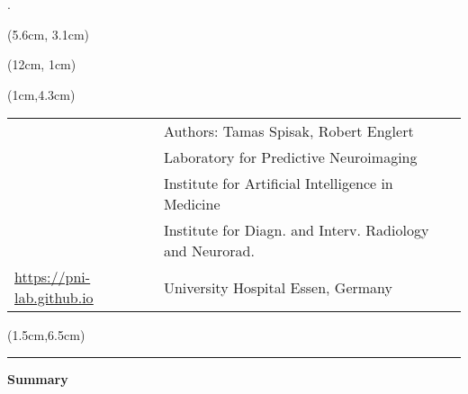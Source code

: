 \begin{titlepage}.
    

    \vspace{2.5cm}

    \begin{textblock*}{15cm}(5.6cm, 3.1cm)
        \begin{LARGE}
                \makeatletter
                \noindent\textcolor{black}{\@title}
                \makeatother
        \end{LARGE}
    \end{textblock*}
    \begin{textblock*}{12cm}(12cm, 1cm)
        \begin{LARGE}
                \makeatletter
                \noindent\textcolor{black}{\mysubtitle}
                \makeatother
        \end{LARGE}
    \end{textblock*}

    \begin{textblock*}{22cm}(1cm,4.3cm)
        \makeatletter
        \begin{large}
            \setcellgapes{0.5pt}
            \makegapedcells
            {\color{black}\begin{tabularx}{22cm}{p{4.5cm}p{10.5cm}}
                & Authors: Tamas Spisak, Robert Englert \\
                 & Laboratory for Predictive Neuroimaging   \\
                  \newline & Institute for Artificial Intelligence in Medicine  \\
                   & Institute for Diagn. and Interv. Radiology and Neurorad. \\
                \href{https://pni-lab.github.io}{\color{pniblue}\underline{https://pni-lab.github.io}} & University Hospital Essen, Germany
            \end{tabularx}}
        \end{large}
        \makeatother
    \end{textblock*}

    \begin{textblock*}{18cm}(1.5cm,6.5cm)
        \begin{large}
            \begin{center}
                \par\noindent\rule{\textwidth\color{pniblue}}{0.4pt}
                \textbf{\color{pniblue}Summary}
            \end{center}


\end{large}
\end{textblock*}
\end{titlepage}
